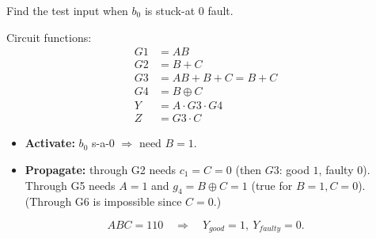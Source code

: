 \documentclass[a4paper, 10pt]{article}
\begin{document}
\begin{center}
\end{center}

\begin{problem}
Find the test input when \( b_0 \) is stuck-at 0 fault.
\end{problem}

\begin{solution}
	\noindent Circuit functions:
	\begin{align*}
		G1 & = AB                \\
		G2 & = B+C               \\
		G3 & = AB+B+C = B+C      \\
		G4 & = B\oplus C         \\
		Y  & = A\cdot G3\cdot G4 \\
		Z  & = G3\cdot C
	\end{align*}

	\begin{itemize}
		\item \textbf{Activate:} \( b_0 \) s-a-0 \( \Rightarrow \) need \( B=1 \).
		\item \textbf{Propagate:} through G2 needs \( c_1=C=0 \) (then \( G3 \): good \( 1 \), faulty \( 0 \)).
		      Through G5 needs \( A=1 \) and \( g_4=B\oplus C=1 \) (true for \( B=1,C=0 \)).
		      (Through G6 is impossible since \( C=0 \).)
	\end{itemize}
	\[ \boxed{ABC = 110} \quad \Rightarrow \quad Y_{good}=1,\ Y_{faulty}=0. \]
\end{solution}
\end{document}
